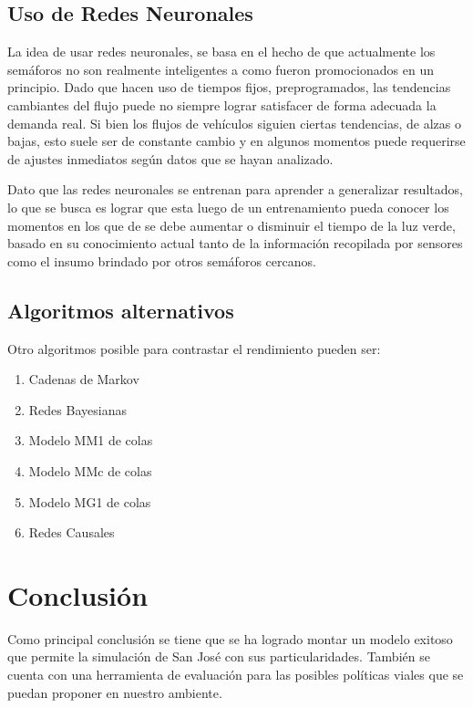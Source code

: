 \documentclass[12pt,journal,compsoc]{IEEEtran}
\begin{document}
\subsection{Uso de Redes Neuronales}
La idea de usar redes neuronales, se basa en el hecho de que actualmente los sem\'{a}foros no son realmente inteligentes a como fueron promocionados en un principio. Dado que hacen uso de tiempos fijos, preprogramados, las tendencias cambiantes del flujo puede no siempre lograr satisfacer de forma adecuada la demanda real. Si bien los flujos de veh\'{i}culos siguien ciertas tendencias, de alzas o bajas, esto suele ser de constante cambio y en algunos momentos puede requerirse de ajustes inmediatos seg\'{u}n datos que se hayan analizado.

Dato que las redes neuronales se entrenan para aprender a generalizar resultados, lo que se busca es lograr que esta luego de un entrenamiento pueda conocer los momentos en los que de se debe aumentar o disminuir el tiempo de la luz verde, basado en su conocimiento actual tanto de la informaci\'{o}n recopilada por sensores como el insumo brindado por otros sem\'{a}foros cercanos.

\subsection{Algoritmos alternativos}
Otro algoritmos posible para contrastar el rendimiento pueden ser:
\begin{enumerate}
\item Cadenas de Markov
\item Redes Bayesianas
\item Modelo MM1 de colas
\item Modelo MMc de colas
\item Modelo MG1 de colas
\item Redes Causales
\end{enumerate}
		
\section{Conclusi\'on}
Como principal conclusi\'on se tiene que se ha logrado montar un modelo exitoso que permite la simulaci\'on de San Jos\'e con sus particularidades. Tambi\'en se cuenta con una herramienta de evaluaci\'on para las posibles pol\'iticas viales que se puedan proponer en nuestro ambiente. 
\end{document}
